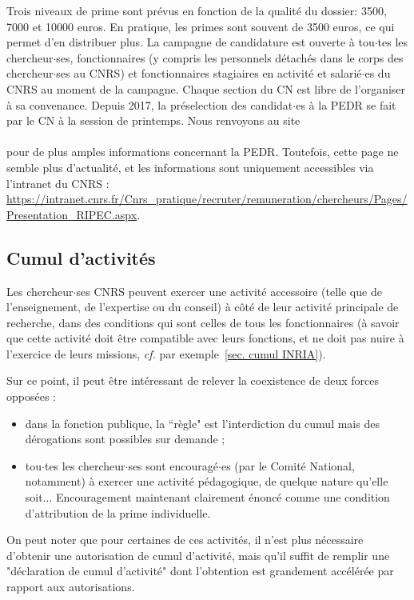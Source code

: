 Trois niveaux de prime sont pr\'evus en fonction de la qualit\'e du dossier: 3500, 7000 et 10000 euros. En pratique, les primes sont souvent de 3500 euros, ce qui permet d'en distribuer plus. 
La campagne de candidature est ouverte \`a tou$\cdot$tes les chercheur$\cdot$ses, fonctionnaires (y compris les personnels
d\'etach\'es dans le corps des chercheur$\cdot$ses au CNRS) et fonctionnaires stagiaires en activit\'e et salari\'e$\cdot$es
 du CNRS au moment de la campagne. Chaque section du CN est libre
de l'organiser \`a sa convenance. Depuis 2017, la pr\'eselection des candidat$\cdot$es \`a la PEDR se fait par le CN \`a la session de printemps. Nous renvoyons au site\\
\\
pour de plus amples informations concernant la PEDR.
Toutefois, cette page ne semble plus d'actualité, et les informations sont uniquement accessibles via l'intranet du CNRS :\\
\url{https://intranet.cnrs.fr/Cnrs_pratique/recruter/remuneration/chercheurs/Pages/Presentation_RIPEC.aspx}.

\subsection{Cumul d'activit\'es}
\label{sec. cumul CNRS}

Les chercheur$\cdot$ses CNRS peuvent exercer une activit\'e accessoire (telle
que de l'enseignement, de l'expertise ou du conseil) \`a c\^ot\'e de
leur activit\'e principale de recherche, dans des conditions qui sont celles de tous les fonctionnaires (\`a savoir que cette activit\'e doit
\^etre compatible avec leurs fonctions, et ne doit pas nuire \`a
l'exercice de leurs missions, {\em cf.} par exemple~\ref{sec. cumul INRIA}).

Sur ce point, il peut \^etre int\'eressant de relever la coexistence de deux forces oppos\'ees :
\begin{itemize}
\item dans la fonction publique, la ``r\`egle" est l'interdiction du cumul mais des d\'erogations
sont possibles sur demande ;
\item tou$\cdot$tes les chercheur$\cdot$ses sont encourag\'e$\cdot$es (par le Comit\'e National, notamment) \`a exercer
 une activit\'e p\'edago\-gique, de quelque nature qu'elle soit... Encouragement maintenant
clairement \'enonc\'e comme une condition d'attribution de la prime individuelle.
\end{itemize}
On peut noter que pour certaines de ces activités, il n'est plus nécessaire d'obtenir une autorisation de cumul d'activité, mais qu'il suffit de remplir une "déclaration de cumul d'activit\'e" dont l'obtention est grandement accélérée par rapport aux autorisations.

